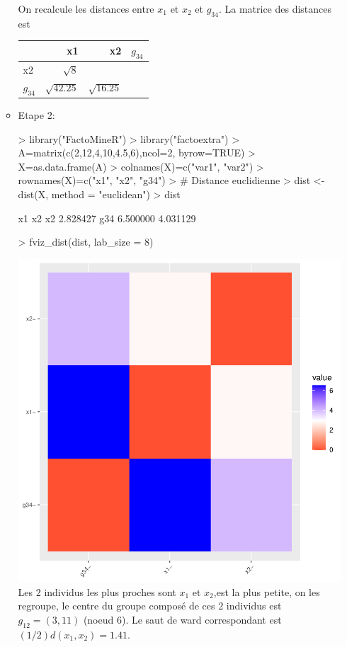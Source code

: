 \documentclass[a4paper]{article}
\begin{document}
\begin{itemize}
\begin{itemize}
On recalcule les distances entre $x_1$ et $x_2$ et $g_{34}$. La matrice des distances est\\
\begin{tabular}{|l||r|r|r|}
\hline
			&x1 &x2 &$g_{34}$\\   
\hline
\hline   
x2 & $\sqrt 8$ &  & \\    
$g_{34}$&  $\sqrt{42.25}$&  $\sqrt{16.25}$  &\\
\hline
\end{tabular}
\item Etape 2:
\begin{Schunk}
\begin{Sinput}
> library("FactoMineR")
> library("factoextra")
> A=matrix(c(2,12,4,10,4.5,6),ncol=2, byrow=TRUE)
> X=as.data.frame(A)
> colnames(X)=c("var1", "var2")
> rownames(X)=c("x1", "x2", "g34")
> # Distance euclidienne
> dist <- dist(X, method = "euclidean")
> dist
\end{Sinput}
\begin{Soutput}
          x1       x2
x2  2.828427         
g34 6.500000 4.031129
\end{Soutput}
\begin{Sinput}
> fviz_dist(dist, lab_size = 8)
\end{Sinput}
\end{Schunk}
\includegraphics{TP3_M1MAS-002}
Les 2 individus les plus proches sont $x_1$ et $x_2$,est la plus petite, on les regroupe, le centre du groupe composé de ces 2 individus est $g_{12}=(3,11)$ (noeud 6). Le saut de ward correspondant est $(1/2)d(x_1,x_2)=1.41$.

\end{itemize}
\end{itemize}
\end{document}
